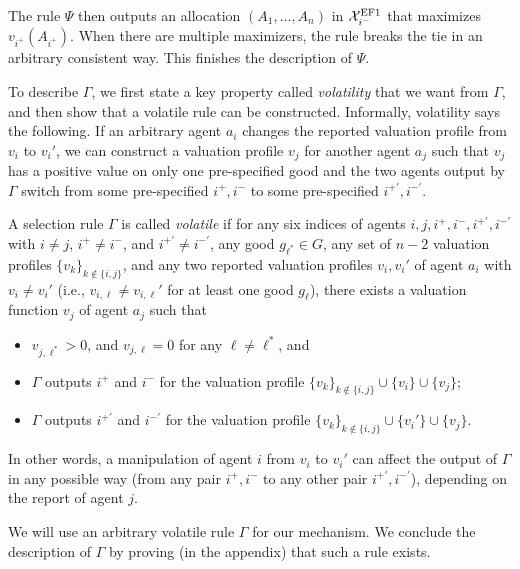 The rule $\Psi$ then outputs an allocation $(A_1,\ldots,A_n)$ in $\mathcal{X}^{\mathrm{EF1}}_{i^-}$ that maximizes $v_{i^+}(A_{i^+})$.
When there are multiple maximizers, the rule breaks the tie in an arbitrary consistent way.
This finishes the description of $\Psi$.

To describe $\Gamma$, we first state a key property called \emph{volatility} that we want from $\Gamma$, and then show that a volatile rule can be constructed.
Informally, volatility says the following.
If an arbitrary agent $a_i$ changes the reported valuation profile from $v_i$ to $v_i'$, we can construct a valuation profile $v_j$ for another agent $a_j$ such that $v_j$ has a positive value on only one pre-specified good and the two agents output by $\Gamma$ switch from some pre-specified $i^+,i^-$ to some pre-specified $i^{+'},i^{-'}$.

\begin{definition}
A selection rule $\Gamma$ is called \emph{volatile}
if 
for any six indices of agents $i,j,i^+,i^-,i^{+'},i^{-'}$ with $i\neq j$, $i^+\neq i^-$, and $i^{+'}\neq i^{-'}$, any good $g_{\ell^\ast}\in G$, any set of $n-2$ valuation profiles $\{v_k\}_{k\notin \{i,j\}}$, and any two reported valuation profiles $v_i,v_i'$ of agent $a_i$ with $v_i\neq v_i'$ (i.e., $v_{i,\ell}\neq v_{i,\ell}'$ for at least one good $g_{\ell}$), there exists a valuation function $v_j$ of agent $a_j$ such that
\begin{itemize}
    \item $v_{j,\ell^\ast}>0$, and $v_{j,\ell}=0$ for any $\ell\neq\ell^\ast$, and
    \item $\Gamma$ outputs $i^+$ and $i^-$ for the valuation profile $\{v_k\}_{k\notin\{i,j\}}\cup\{v_i\}\cup\{v_j\}$;
    \item $\Gamma$ outputs $i^{+'}$ and $i^{-'}$ for the valuation profile $\{v_k\}_{k\notin\{i,j\}}\cup\{v_i'\}\cup\{v_j\}$.
\end{itemize}
\end{definition}
In other words, a manipulation of agent $i$ from $v_i$ to $v_i'$ can affect the output of $\Gamma$ in any possible way (from any pair $i^+,i^-$ to any other pair $i^{+'},i^{-'}$), depending on the report of agent $j$.

We will use an arbitrary volatile rule $\Gamma$ for our mechanism.
We conclude the description of $\Gamma$ by proving (in the appendix) that such a rule exists.

